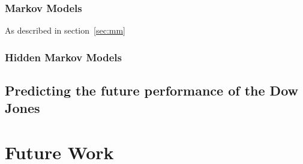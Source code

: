 \documentclass[10pt, twocolumn]{article}
\begin{document}
\begin{itemize}
\subsubsection{Markov Models}
\label{mm-eval}

As described in section~\ref{sec:mm}

\subsubsection{Hidden Markov Models}
\label{hmm-eval}

\subsection{Predicting the future performance of the Dow Jones}
\label{predict-dj}

\end{itemize}

\section{Future Work}



\end{document}
